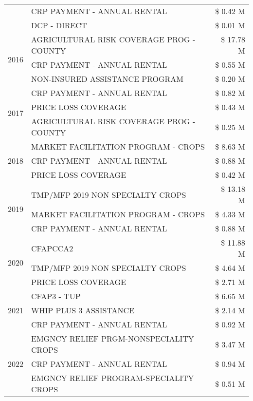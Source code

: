 \begin{tabular}{llr}
 & CRP PAYMENT - ANNUAL RENTAL & \$ 0.42 M \\
 & DCP - DIRECT & \$ 0.01 M \\
\cline{1-3}
\multirow[t]{3}{*}{2016} & AGRICULTURAL RISK COVERAGE PROG - COUNTY & \$ 17.78 M \\
 & CRP PAYMENT - ANNUAL RENTAL & \$ 0.55 M \\
 & NON-INSURED ASSISTANCE PROGRAM & \$ 0.20 M \\
\cline{1-3}
\multirow[t]{3}{*}{2017} & CRP PAYMENT - ANNUAL RENTAL & \$ 0.82 M \\
 & PRICE LOSS COVERAGE & \$ 0.43 M \\
 & AGRICULTURAL RISK COVERAGE PROG - COUNTY & \$ 0.25 M \\
\cline{1-3}
\multirow[t]{3}{*}{2018} & MARKET FACILITATION PROGRAM - CROPS & \$ 8.63 M \\
 & CRP PAYMENT - ANNUAL RENTAL & \$ 0.88 M \\
 & PRICE LOSS COVERAGE & \$ 0.42 M \\
\cline{1-3}
\multirow[t]{3}{*}{2019} & TMP/MFP 2019 NON SPECIALTY CROPS & \$ 13.18 M \\
 & MARKET FACILITATION PROGRAM - CROPS & \$ 4.33 M \\
 & CRP PAYMENT - ANNUAL RENTAL & \$ 0.88 M \\
\cline{1-3}
\multirow[t]{3}{*}{2020} & CFAPCCA2 & \$ 11.88 M \\
 & TMP/MFP 2019 NON SPECIALTY CROPS & \$ 4.64 M \\
 & PRICE LOSS COVERAGE & \$ 2.71 M \\
\cline{1-3}
\multirow[t]{3}{*}{2021} & CFAP3 - TUP & \$ 6.65 M \\
 & WHIP PLUS 3 ASSISTANCE & \$ 2.14 M \\
 & CRP PAYMENT - ANNUAL RENTAL & \$ 0.92 M \\
\cline{1-3}
\multirow[t]{3}{*}{2022} & EMGNCY RELIEF PRGM-NONSPECIALITY CROPS & \$ 3.47 M \\
 & CRP PAYMENT - ANNUAL RENTAL & \$ 0.94 M \\
 & EMGNCY RELIEF PROGRAM-SPECIALITY CROPS & \$ 0.51 M \\
\cline{1-3}
\bottomrule
\end{tabular}
